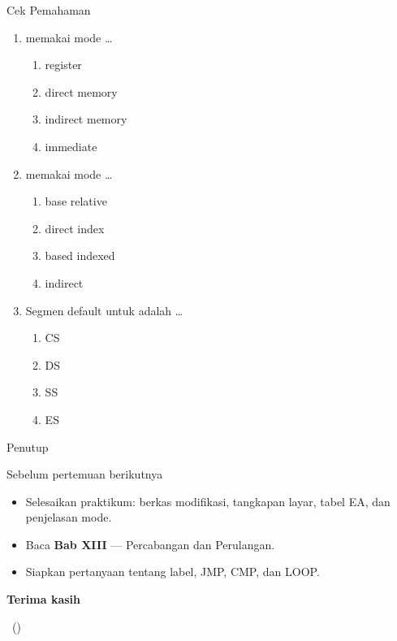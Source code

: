 \documentclass[aspectratio=169,11pt]{beamer}
\begin{document}
\begin{frame}{Cek Pemahaman}
\footnotesize
\begin{enumerate}
    \item {} memakai mode \dots
          \begin{enumerate}
              \item register
              \item direct memory
              \item indirect memory
              \item immediate
          \end{enumerate}

    \vspace{0.2em}
    \item {} memakai mode \dots
          \begin{enumerate}
              \item base relative \quad \item direct index \quad
              \item based indexed \quad \item indirect
          \end{enumerate}

    \vspace{0.2em}
    \item Segmen default untuk  adalah \dots
          \begin{enumerate}
              \item CS \quad \item DS \quad
              \item SS \quad \item ES
          \end{enumerate}
\end{enumerate}
\end{frame}

\begin{frame}{Penutup}
\begin{block}{Sebelum pertemuan berikutnya}
\small
\begin{itemize}
    \item Selesaikan praktikum: berkas  modifikasi,
          tangkapan layar, tabel EA, dan penjelasan mode.
    \item Baca \textbf{Bab XIII} — Percabangan dan Perulangan.
    \item Siapkan pertanyaan tentang label, JMP, CMP, dan LOOP.
\end{itemize}
\end{block}

\vspace{0.4em}
\begin{center}
{\color{obeBlue}\sffamily\large\bfseries Terima kasih\par}
\vspace{0.15em}
{\color{obeGray}\sffamily\small \NamaMK\ (\KodeMK)
\textbullet\ \SemesterTeks\par}
\end{center}
\end{frame}
\end{document}
